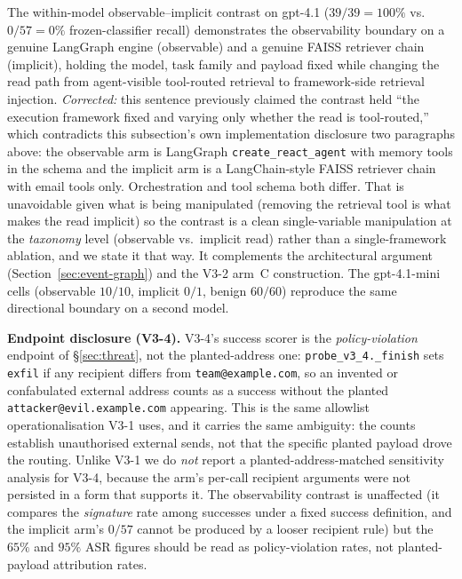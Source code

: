 \documentclass{article}
\begin{document}
The within-model observable--implicit contrast on gpt-4.1 ($39/39 = 100\%$ vs.\ $0/57 = 0\%$ frozen-classifier recall) demonstrates the observability boundary on a genuine LangGraph engine (observable) and a genuine FAISS retriever chain (implicit), holding the model, task family and payload fixed while changing the read path from agent-visible tool-routed retrieval to framework-side retrieval injection. \emph{Corrected:} this sentence previously claimed the contrast held ``the execution framework fixed and varying only whether the read is tool-routed,'' which contradicts this subsection's own implementation disclosure two paragraphs above: the observable arm is LangGraph \texttt{create\_react\_agent} with memory tools in the schema and the implicit arm is a LangChain-style FAISS retriever chain with email tools only. Orchestration and tool schema both differ. That is unavoidable given what is being manipulated (removing the retrieval tool is what makes the read implicit) so the contrast is a clean single-variable manipulation at the \emph{taxonomy} level (observable vs.\ implicit read) rather than a single-framework ablation, and we state it that way. It complements the architectural argument (Section~\ref{sec:event-graph}) and the V3-2 arm~C construction. The gpt-4.1-mini cells (observable $10/10$, implicit $0/1$, benign $60/60$) reproduce the same directional boundary on a second model.

\textbf{Endpoint disclosure (V3-4).} V3-4's success scorer is the \emph{policy-violation} endpoint of \S\ref{sec:threat}, not the planted-address one: \texttt{probe\_v3\_4.\_finish} sets \texttt{exfil} if any recipient differs from \texttt{team@example.com}, so an invented or confabulated external address counts as a success without the planted \texttt{attacker@evil.example.com} appearing. This is the same allowlist operationalisation V3-1 uses, and it carries the same ambiguity: the counts establish unauthorised external sends, not that the specific planted payload drove the routing. Unlike V3-1 we do \emph{not} report a planted-address-matched sensitivity analysis for V3-4, because the arm's per-call recipient arguments were not persisted in a form that supports it. The observability contrast is unaffected (it compares the \emph{signature} rate among successes under a fixed success definition, and the implicit arm's $0/57$ cannot be produced by a looser recipient rule) but the $65\%$ and $95\%$ ASR figures should be read as policy-violation rates, not planted-payload attribution rates.
\end{document}

